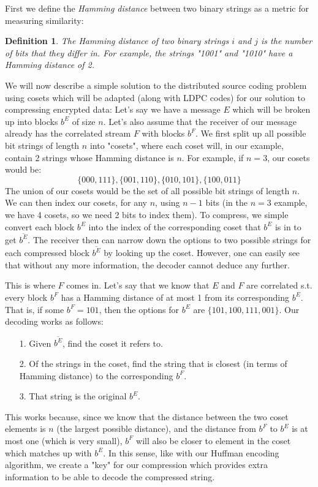 \documentclass[11pt]{article}
\newtheorem{defn}[thm]{Definition}{\bfseries}{\rmfamily}
\begin{document}
First we define the \emph{Hamming distance} between two binary strings as a metric for measuring similarity:
\begin{defn}
The \emph{Hamming distance} of two binary strings $i$ and $j$ is the number of bits that they differ in. 
For example, the strings "1001" and "1010" have a Hamming distance of 2. 
\end{defn}

We will now describe a simple solution to the distributed source coding problem using cosets which 
will be adapted (along with LDPC codes) for our solution to compressing encrypted data: 
Let's say we have a message $E$ which will be broken up into blocks $b^E$ of size $n$. 
Let's also assume that the receiver of our message already has the correlated stream $F$ with blocks $b^F$. 
We first split up all possible bit strings of length $n$ into "cosets", where each coset will, 
in our example, contain 2 strings whose Hamming distance is $n$. 
For example, if $n=3$, our cosets would be:
$$\{000,111\},\{001,110\},\{010,101\},\{100,011\}$$
The union of our cosets would be the set of all possible bit strings of length $n$. 
We can then index our cosets, for any $n$, using $n-1$ bits (in the $n=3$ example, 
we have 4 cosets, so we need 2 bits to index them). To compress, we simple convert each 
block $b^E$ into the index of the corresponding coset that $b^E$ is in to get $\overline{b^E}$. The receiver then 
can narrow down the options to two possible strings for each compressed block $\overline{b^E}$ by looking up the coset. 
However, one can easily see that without any more information, the decoder cannot deduce any further. 

This is where $F$ comes in. Let's say that we know that $E$ and $F$ are correlated s.t. every block $b^F$ has 
a Hamming distance of at most 1 from its corresponding $b^E$. That is, if some $b^F=101$, 
then the options for $b^E$ are $\{101,100,111,001\}$. Our decoding works as follows:
\begin{itemize}
	\item[1.]Given $\overline{b^E}$, find the coset it refers to. 
	\item[2.]Of the strings in the coset, find the string that is closest (in terms of Hamming distance) 
to the corresponding $b^F$. 
	\item[3.]That string is the original $b^E$.
\end{itemize}
This works because, since we know that the distance between the two coset elements is $n$ (the largest 
possible distance), and the distance from $b^F$ to $b^E$ is at most one (which is very small), 
$b^F$ will also be closer to element in the coset which matches up with $b^E$. In this sense, 
like with our Huffman encoding algorithm, we create a "key" for our compression which provides 
extra information to be able to decode the compressed string. 
\end{document}

